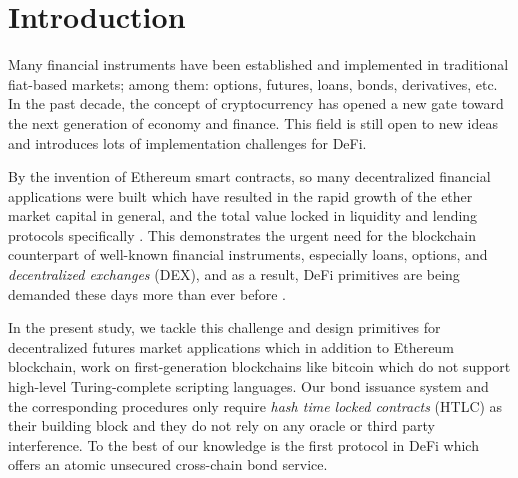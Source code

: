 \section{Introduction}
\label{sec:w-motiv}

Many financial instruments have been established and implemented in traditional fiat-based markets; 
among them: options, futures, loans, bonds, derivatives, etc. In the past decade, the concept of cryptocurrency has opened a new gate toward the next generation of economy and finance. This field is still open to new ideas and introduces lots of implementation challenges for DeFi. 

By the invention of Ethereum smart contracts, so many decentralized financial applications were built which have resulted in the rapid growth of the ether market capital in general, and the total value locked in liquidity and lending protocols specifically . This demonstrates the urgent need for the blockchain counterpart of well-known financial instruments, especially loans, options, and \emph{decentralized exchanges} (DEX), and as a result, DeFi primitives are being demanded these days more than ever before . 

In the present study, we tackle this challenge and design primitives for decentralized futures market applications which in addition to Ethereum blockchain, work on first-generation blockchains like bitcoin which do not support high-level Turing-complete scripting languages. Our bond issuance system and the corresponding procedures only require \emph{hash time locked contracts} (HTLC) as their building block and they do not rely on any oracle or third party interference. To the best of our knowledge \abcd is the first protocol in DeFi which offers an atomic unsecured cross-chain bond service.

